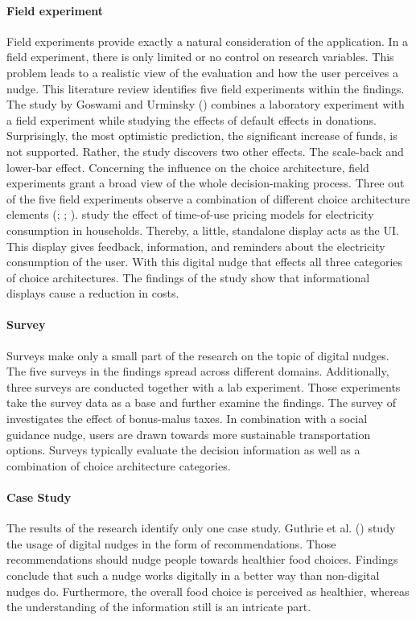 \paragraph{Field experiment}
Field experiments provide exactly a natural consideration of the application. In a field experiment, there is only limited or no control on research variables. This problem leads to a realistic view of the evaluation and how the user perceives a nudge. This literature review identifies five field experiments within the findings. The study by Goswami and Urminsky (\citeyear{goswami_when_2016}) combines a laboratory experiment with a field experiment while studying the effects of default effects in donations. Surprisingly, the most optimistic prediction, the significant increase of funds, is not supported. Rather, the study discovers two other effects. The scale-back and lower-bar effect. 
Concerning the influence on the choice architecture, field experiments grant a broad view of the whole decision-making process. Three out of the five field experiments observe a combination of different choice architecture elements (\cite{miller_effects_2016}; \cite{cosmo_nudging_2017}; \cite{mazar_if_2018}). \cite{cosmo_nudging_2017} study the effect of time-of-use pricing models for electricity consumption in households. Thereby, a little, standalone display acts as the UI. This display gives feedback, information, and reminders about the electricity consumption of the user. With this digital nudge that effects all three categories of choice architectures. The findings of the study show that informational displays cause a reduction in costs.

\paragraph{Survey}
Surveys make only a small part of the research on the topic of digital nudges. The five surveys in the findings spread across different domains. Additionally, three surveys are conducted together with a lab experiment. Those experiments take the survey data as a base and further examine the findings. The survey of \cite{hilton_tax_2014} investigates the effect of bonus-malus taxes. In combination with a social guidance nudge, users are drawn towards more sustainable transportation options. Surveys typically evaluate the decision information as well as a combination of choice architecture categories.

\paragraph{Case Study}
 The results of the research identify only one case study. Guthrie et al. (\citeyear{guthrie_nudging_2015}) study the usage of digital nudges in the form of recommendations. Those recommendations should nudge people towards healthier food choices. Findings conclude that such a nudge works digitally in a better way than non-digital nudges do. Furthermore, the overall food choice is perceived as healthier, whereas the understanding of the information still is an intricate part.



